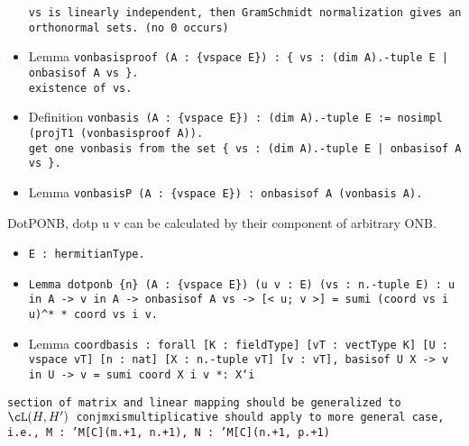 \begin{itemize}
  \tt{vs} is linearly independent, then GramSchmidt normalization gives an orthonormal sets. (no 0 occurs)
\item Lemma \tt{vonbasis\us proof (A : \{vspace E\}) :
  \{ vs : (\bs dim A).-tuple E | onbasis\us of A vs \}.} \\
  existence of \tt{vs}.
\item Definition \tt{vonbasis (A : \{vspace E\}) : (\bs dim A).-tuple E :=
  nosimpl (projT1 (vonbasis\us proof A)).} \\
  get one vonbasis from the set \tt{\{ vs : (\bs dim A).-tuple E | onbasis\us of A vs \}.}
\item Lemma \tt{vonbasisP (A : \{vspace E\}) : onbasis\us of A (vonbasis A).}
\end{itemize}


\noindent DotP\us ONB, dotp u v can be calculated by their component of arbitrary ONB.
\begin{itemize}
\item \tt{E : hermitianType}.
\item \tt{Lemma dotp\us onb \{n\} (A : \{vspace E\}) (u v : E) (vs : n.-tuple E) :
  u \bs in A -> v \bs in A -> onbasis\us of A vs ->
    [< u; v >] = \bs sum\us i (coord vs i u)\^{}* * coord vs i v.} \\
\item Lemma \tt{coord\us basis :
    forall [K : fieldType] [vT : vectType K]
      [U : {vspace vT}] [n : nat] [X : n.-tuple vT]
      [v : vT],
    basis\us of U X ->
    v \bs in U -> v = \bs sum\us i coord X i v *: X`\us i}
\end{itemize}


\tt{section of matrix and linear mapping should be generalized to $\cL(H,H^\prime)$}
\tt{conjmx\us is\us multiplicative} should apply to more general case, i.e., \tt{M : 'M[C]\us(m.+1, n.+1), N : 'M[C]\us(n.+1, p.+1)}
\fi
\fi

